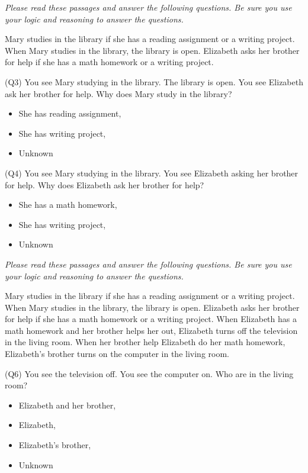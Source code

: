 \documentclass[]{interact}
\theoremstyle{plain}%
\theoremstyle{definition}
\theoremstyle{remark}
\begin{document}
\emph{Please read these passages and answer the following questions. Be sure you use your logic and reasoning to answer the questions.}

Mary studies in the library if she has a reading assignment or a writing project. When Mary studies in the library, the library is open. Elizabeth asks her brother for help if she has a math homework or a writing project.

(Q3) You see Mary studying in the library. The library is open. You see Elizabeth ask her brother for help. Why does Mary study in the library?
\begin{itemize}
\item She has reading assignment,
\item She has writing project,
\item Unknown
\end{itemize}

(Q4) You see Mary studying in the library. You see Elizabeth asking her brother for help. Why does Elizabeth ask her brother for help?
\begin{itemize}
\item She has a math homework,
\item She has writing project,
\item Unknown
\end{itemize}

\emph{Please read these passages and answer the following questions. Be sure you use your logic and reasoning to answer the questions.}

Mary studies in the library if she has a reading assignment or a writing project. When Mary studies in the library, the library is open. Elizabeth asks her brother for help if she has a math homework or a writing project. When Elizabeth has a math homework and her brother helps her out, Elizabeth turns off the television in the living room. When her brother help Elizabeth do her math homework, Elizabeth’s brother turns on the computer in the living room.

(Q6) You see the television off. You see the computer on. Who are in the living room?
\begin{itemize}
\item Elizabeth and her brother,
\item Elizabeth,
\item Elizabeth’s brother,
\item Unknown
\end{itemize}
\end{document}
